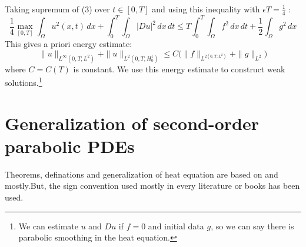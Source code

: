 Taking supremum of (3) over $ t \in [0,T]$  and using this inequality with   $\epsilon T = \frac{1}{4}$ :
\[ \frac{1}{4} \max_{[0,T]} \int_{\Omega} u^{2} (x,t)\,dx +\int_{0}^{T} \int_{\Omega} |Du|^{2} \,dx\,dt \leq T \int_{0}^{T}\int_{\Omega} f^{2}\,dx\,dt + \frac{1}{2} \int_{\Omega} g^{2}\,dx \]
This gives a priori energy estimate:
\begin{equation}
\|u\|_{L^{\infty}(0,T;L^{2})} + \|u\|_{L^{2}(0,T;H_{0}^{1}) }  \leq  C \Big( \|f\|_{L^{2(0,T;L^{2})}} + \|g\|_{L^{2}} \Big)
\end{equation}
where $ C= C(T)$ is constant. We use this energy estimate to construct weak solutions.\footnote{ We can estimate $u$ and $Du$ if $f=0$ and initial data $g$, so we can say there is parabolic smoothing in the heat equation.}


















\section{Generalization of second-order parabolic PDEs}
Theorems, definations and generalization of heat equation are based on \cite{evans} and \cite{lecture2} mostly.But, the sign convention used mostly in every literature or books has been used.


